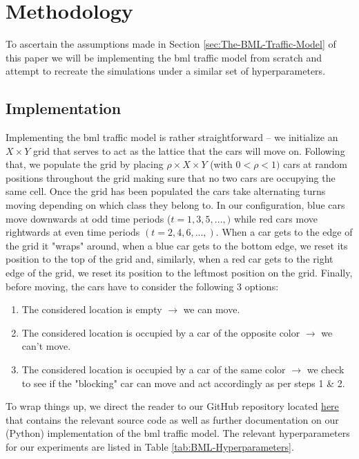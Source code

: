 \section{Methodology}
\label{sec:Methodology}
To ascertain the assumptions made in Section \ref{sec:The-BML-Traffic-Model} of this paper we will be implementing the \gls{bml} traffic model from scratch and attempt to recreate the simulations under a similar set of hyperparameters.

\subsection{Implementation}
\label{subsec:Methodology:Implementation}
Implementing the \gls{bml} traffic model is rather straightforward -- we initialize an $X \times Y$ grid that serves to act as the lattice that the cars will move on. Following that, we populate the grid by placing $\rho \times X \times Y$ (with $0 < \rho < 1)$ cars at random positions throughout the grid making sure that no two cars are occupying the same cell. Once the grid has been populated the cars take alternating turns moving depending on which class they belong to. In our configuration, blue cars move downwards at odd time periods ($t = 1, 3, 5, ...,)$ while red cars move rightwards at even time periods $(t = 2, 4, 6, ...,)$. When a car gets to the edge of the grid it "wraps" around, \eg when a blue car gets to the bottom edge, we reset its position to the top of the grid and, similarly, when a red car gets to the right edge of the grid, we reset its position to the leftmost position on the grid. Finally, before moving, the cars have to consider the following 3 options:

\begin{enumerate}
    \item The considered location is empty $\rightarrow$ we can move.
    \item The considered location is occupied by a car of the opposite color $\rightarrow$ we can't move.
    \item The considered location is occupied by a car of the same color $\rightarrow$ we check to see if the "blocking" car can move and act accordingly as per steps 1 \& 2.
\end{enumerate}

\noindent To wrap things up, we direct the reader to our GitHub repository located \href{https://github.com/KareemAlSaudi-RUG/Modelling-and-Simulation}{here} that contains the relevant source code as well as further documentation on our (Python) implementation of the \gls{bml} traffic model. The relevant hyperparameters for our experiments are listed in Table \ref{tab:BML-Hyperparameters}.

